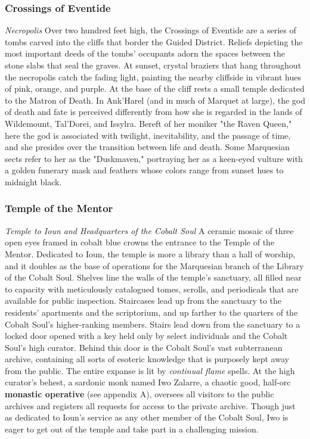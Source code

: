 \documentclass[10pt,a4,twoside,twocolumn,openany,nodeprecatedcode]{dndbook}
\begin{document}
\subsubsection{Crossings of Eventide}
\textit{Necropolis}
Over two hundred feet high, the Crossings of Eventide are a series of tombs carved into the cliffs that border the Guided District. Reliefs depicting the most important deeds of the tombs' occupants adorn the spaces between the stone slabs that seal the graves. At sunset, crystal braziers that hang throughout the necropolis catch the fading light, painting the nearby cliffside in vibrant hues of pink, orange, and purple.
At the base of the cliff rests a small temple dedicated to the Matron of Death. In Ank'Harel (and in much of Marquet at large), the god of death and fate is perceived differently from how she is regarded in the lands of Wildemount, Tal'Dorei, and Issylra. Bereft of her moniker "the Raven Queen," here the god is associated with twilight, inevitability, and the passage of time, and she presides over the transition between life and death. Some Marquesian sects refer to her as the "Duskmaven," portraying her as a keen-eyed vulture with a golden funerary mask and feathers whose colors range from sunset hues to midnight black.
\subsubsection{Temple of the Mentor}
\textit{Temple to Ioun and Headquarters of the Cobalt Soul}
A ceramic mosaic of three open eyes framed in cobalt blue crowns the entrance to the Temple of the Mentor. Dedicated to Ioun, the temple is more a library than a hall of worship, and it doubles as the base of operations for the Marquesian branch of the Library of the Cobalt Soul. Shelves line the walls of the temple's sanctuary, all filled near to capacity with meticulously catalogued tomes, scrolls, and periodicals that are available for public inspection.
Staircases lead up from the sanctuary to the residents' apartments and the scriptorium, and up farther to the quarters of the Cobalt Soul's higher-ranking members. Stairs lead down from the sanctuary to a locked door opened with a key held only by select individuals and the Cobalt Soul's high curator. Behind this door is the Cobalt Soul's vast subterranean archive, containing all sorts of esoteric knowledge that is purposely kept away from the public. The entire expanse is lit by \textit{continual flame} spells.
At the high curator's behest, a sardonic monk named Iwo Zalarre, a chaotic good, half-orc \textbf{monastic operative} (see appendix A), oversees all visitors to the public archives and registers all requests for access to the private archive. Though just as dedicated to Ioun's service as any other member of the Cobalt Soul, Iwo is eager to get out of the temple and take part in a challenging mission.
\end{document}
